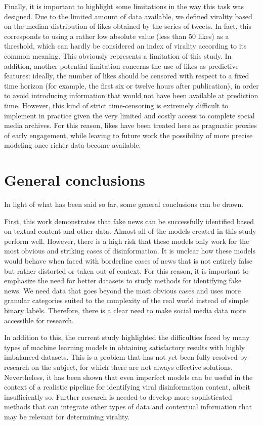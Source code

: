 \documentclass[a4paper,twoside,12pt]{book}
\begin{document}
Finally, it is important to highlight some limitations in the way this task was designed. Due to the limited amount of data available, we defined virality based on the median distribution of likes obtained by the series of tweets. In fact, this corresponds to using a rather low absolute value (less than 50 likes) as a threshold, which can hardly be considered an index of virality according to its common meaning. This obviously represents a limitation of this study. In addition, another potential limitation concerns the use of likes as predictive features: ideally, the number of likes should be censored with respect to a fixed time horizon (for example, the first six or twelve hours after publication), in order to avoid introducing information that would not have been available at prediction time. However, this kind of strict time-censoring is extremely difficult to implement in practice given the very limited and costly access to complete social media archives. For this reason, likes have been treated here as pragmatic proxies of early engagement, while leaving to future work the possibility of more precise modeling once richer data become available.

\section{General conclusions}
In light of what has been said so far, some general conclusions can be drawn.

First, this work demonstrates that fake news can be successfully identified based on textual content and other data. Almost all of the models created in this study perform well. However, there is a high risk that these models only work for the most obvious and striking cases of disinformation. It is unclear how these models would behave when faced with borderline cases of news that is not entirely false but rather distorted or taken out of context. For this reason, it is important to emphasize the need for better datasets to study methods for identifying fake news. We need data that goes beyond the most obvious cases and uses more granular categories suited to the complexity of the real world instead of simple binary labels. Therefore, there is a clear need to make social media data more accessible for research.

In addition to this, the current study highlighted the difficulties faced by many types of machine learning models in obtaining satisfactory results with highly imbalanced datasets. This is a problem that has not yet been fully resolved by research on the subject, for which there are not always effective solutions. Nevertheless, it has been shown that even imperfect models can be useful in the context of a realistic pipeline for identifying viral disinformation content, albeit insufficiently so. Further research is needed to develop more sophisticated methods that can integrate other types of data and contextual information that may be relevant for determining virality.
\end{document}
